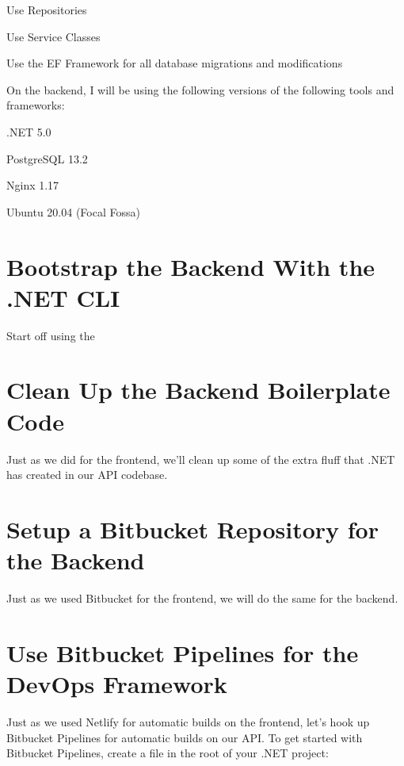 \documentclass[paper=6in:9in,pagesize=pdftex,headinclude=on,footinclude=on,12pt]{scrbook}
\begin{document}

\begin{arrows}
\item Use Repositories 
\item Use Service Classes
\item Use the EF Framework for all database migrations and modifications
\end{arrows}


On the backend, I will be using the following versions of the following tools and frameworks:

\begin{arrows}
\item .NET 5.0
\item PostgreSQL 13.2
\item Nginx 1.17
\item Ubuntu 20.04 (Focal Fossa)
\end{arrows}

\section{Bootstrap the Backend With the .NET CLI}


Start off using the 

\section{Clean Up the Backend Boilerplate Code}

Just as we did for the frontend, we'll clean up some of the extra fluff that .NET has created in our API codebase.

\section{Setup a Bitbucket Repository for the Backend}

Just as we used Bitbucket for the frontend, we will do the same for the backend.

\section{Use Bitbucket Pipelines for the DevOps Framework}

Just as we used Netlify for automatic builds on the frontend, let's hook up Bitbucket Pipelines for automatic builds on our API. To get started with Bitbucket Pipelines, create a  file in the root of your .NET project:
\end{document}
